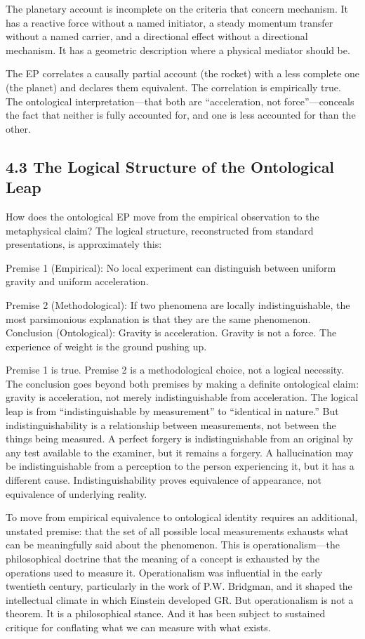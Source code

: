 \documentclass[11pt]{article}
\begin{document}
The planetary account is incomplete on the criteria that concern mechanism. It has a reactive force without a named initiator, a steady momentum transfer without a named carrier, and a directional effect without a directional mechanism. It has a geometric description where a physical mediator should be.

The EP correlates a causally partial account (the rocket) with a less complete one (the planet) and declares them equivalent. The correlation is empirically true. The ontological interpretation---that both are ``acceleration, not force''---conceals the fact that neither is fully accounted for, and one is less accounted for than the other.

\subsection{4.3 The Logical Structure of the Ontological Leap}

How does the ontological EP move from the empirical observation to the metaphysical claim? The logical structure, reconstructed from standard presentations, is approximately this:

Premise 1 (Empirical): No local experiment can distinguish between uniform gravity and uniform acceleration.

Premise 2 (Methodological): If two phenomena are locally indistinguishable, the most parsimonious explanation is that they are the same phenomenon. Conclusion (Ontological): Gravity is acceleration. Gravity is not a force. The experience of weight is the ground pushing up.

Premise 1 is true. Premise 2 is a methodological choice, not a logical necessity. The conclusion goes beyond both premises by making a definite ontological claim: gravity is acceleration, not merely indistinguishable from acceleration. The logical leap is from ``indistinguishable by measurement'' to ``identical in nature.'' But indistinguishability is a relationship between measurements, not between the things being measured. A perfect forgery is indistinguishable from an original by any test available to the examiner, but it remains a forgery. A hallucination may be indistinguishable from a perception to the person experiencing it, but it has a different cause. Indistinguishability proves equivalence of appearance, not equivalence of underlying reality.

To move from empirical equivalence to ontological identity requires an additional, unstated premise: that the set of all possible local measurements exhausts what can be meaningfully said about the phenomenon. This is operationalism---the philosophical doctrine that the meaning of a concept is exhausted by the operations used to measure it. Operationalism was influential in the early twentieth century, particularly in the work of P.W. Bridgman, and it shaped the intellectual climate in which Einstein developed GR. But operationalism is not a theorem. It is a philosophical stance. And it has been subject to sustained critique for conflating what we can measure with what exists.
\end{document}
